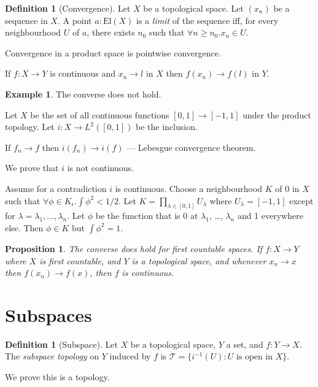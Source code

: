 \documentclass{book}
\newtheorem{prop}[ax]{Proposition}
\theoremstyle{definition}
\newtheorem{df}[ax]{Definition}
\newtheorem{ex}[ax]{Example}
\newcommand{\El}[1]{\ensuremath{\mathrm{El} \left( {#1} \right)}}
\newcommand{\inv}[1]{\ensuremath{{#1}^{-1}}}
\begin{document}
\begin{df}[Convergence]
Let $X$ be a topological space. Let $(x_n)$ be a sequence in $X$. A point $a : \El{X}$ is a \emph{limit} of the sequence iff, for every neighbourhood $U$ of $a$, there exists $n_0$ such that $\forall n \geq n_0. x_n \in U$.
\end{df}

Convergence in a product space is pointwise convergence.

If $f : X \rightarrow Y$ is continuous and $x_n \rightarrow l$ in $X$ then $f(x_n) \rightarrow f(l)$ in $Y$.

\begin{ex}
The converse does not hold.

Let $X$ be the set of all continuous functions $[0,1] \rightarrow [-1,1]$ under the product topology. Let $i : X \rightarrow L^2([0,1])$ be the inclusion.

If $f_n \rightarrow f$ then $i(f_n) \rightarrow i(f)$ --- Lebesgue convergence theorem.

We prove that $i$ is not continuous.

Assume for a contradiction $i$ is continuous. Choose a neighbourhood $K$ of 0 in $X$ such that $\forall \phi \in K _\epsilon. \int \phi^2 < 1/2$. Let $K = \prod_{\lambda \in [0,1]} U_\lambda$ where $U_\lambda = [-1,1]$ except for $\lambda = \lambda_1, \ldots, \lambda_n$. Let $\phi$ be the function that is 0 at $\lambda_1$, \ldots, $\lambda_n$ and 1 everywhere else. Then $\phi \in K$ but $\int \phi^2 = 1$.
\end{ex}

\begin{prop}
The converse does hold for first countable spaces. If $f : X \rightarrow Y$ where $X$ is first countable, and $Y$ is a topological space, and whenever $x_n \rightarrow x$ then $f(x_n) \rightarrow f(x)$, then $f$ is continuous.
\end{prop}

\section{Subspaces}

\begin{df}[Subspace]
Let $X$ be a topological space, $Y$ a set, and $f : Y \rightarrow X$. The \emph{subspace topology} on $Y$ induced by $f$ is $\mathcal{T} = \{ \inv{i}(U) : U \text{ is open in } X \}$.

We prove this is a topology.
\end{df}
\end{document}
